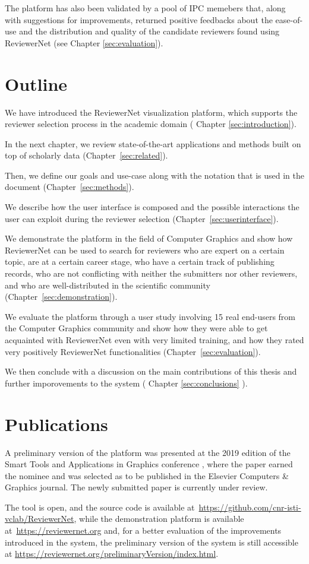 The platform has also been validated by a pool of IPC memebers that, along with suggestions for improvements, returned positive feedbacks about the ease-of-use and the distribution and quality of the candidate reviewers found using ReviewerNet (see Chapter \ref{sec:evaluation}). 

\section{Outline}

We have introduced the ReviewerNet visualization platform, which supports the reviewer selection process in the academic domain ( Chapter \ref{sec:introduction}). 

In the next chapter, we review state-of-the-art applications and methods built on top of scholarly data (Chapter~\ref{sec:related}).

Then, we define our goals and use-case along with the notation that is used in the document (Chapter~\ref{sec:methods}). 

We describe how the user interface is composed and the possible interactions the user can exploit during the reviewer selection (Chapter~\ref{sec:userinterface}). 

We demonstrate the platform in the field of Computer Graphics and show how ReviewerNet can be used to search for reviewers who are expert on a certain topic, are at a certain career stage, who have a certain track of publishing records, who are not conflicting with neither the submitters nor other reviewers, and who are well-distributed in the scientific community (Chapter~\ref{sec:demonstration}). 

We evaluate the platform through a user study involving 15 real end-users from the Computer Graphics community and show how they were able to get acquainted with ReviewerNet even with very limited training, and how they rated very positively ReviewerNet functionalities (Chapter~\ref{sec:evaluation}).  

We then conclude with a discussion on the main contributions of this thesis and further imporovements to the system ( Chapter \ref{sec:conclusions} ).

\section{Publications}

A preliminary version of the platform was presented at the 2019 edition of the Smart Tools and Applications in Graphics conference \cite{stag19}, where the paper earned the  nominee and was selected as  to be published in the Elsevier Computers \& Graphics journal. The newly submitted paper is currently under review.

The tool is open, and the source code is available at~\url{https://github.com/cnr-isti-vclab/ReviewerNet}, while the demonstration platform is available at~\url{https://reviewernet.org} and, for a better evaluation of the improvements introduced in the system, the preliminary version of the system is still accessible at \url{https://reviewernet.org/preliminaryVersion/index.html}.